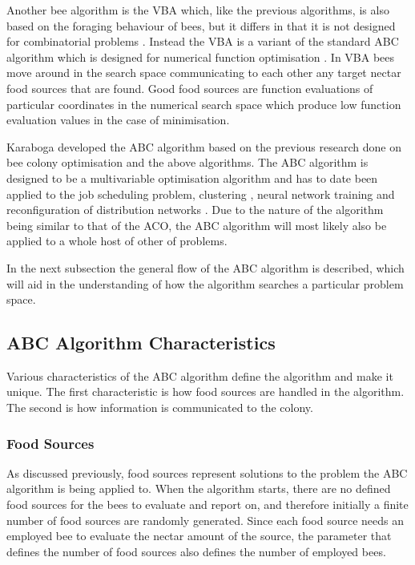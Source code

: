 Another bee algorithm is the \gls{VBA} which, like the previous algorithms, is also based on the foraging behaviour of bees, but it differs in that it is not designed for combinatorial problems \cite{ABCNumericalOptimization}. Instead the \gls{VBA} is a variant of the standard \gls{ABC} algorithm which is designed for numerical function optimisation \cite{ABCNumericalOptimization}. In \gls{VBA} bees move around in the search space communicating to each other any target nectar food sources that are found\cite{ABCNumericalOptimization}. Good food sources are function evaluations of particular coordinates in the numerical search space which produce low function evaluation values in the case of minimisation\cite{ABCNumericalOptimization}.

Karaboga developed the \gls{ABC} algorithm based on the previous research done on bee colony optimisation and the above algorithms. The \gls{ABC} algorithm is designed to be a multivariable optimisation algorithm and has to date been applied to the job scheduling problem, clustering \cite{HybridABCClustering}, neural network training and reconfiguration of distribution networks \cite{ABCReconfigDistro}. Due to the nature of the algorithm being similar to that of the \gls{ACO}, the \gls{ABC} algorithm will most likely also be applied to a whole host of other of problems.

In the next subsection the general flow of the \gls{ABC} algorithm is described, which will aid in the understanding of how the algorithm searches a particular problem space. 
\subsection{ABC Algorithm Characteristics}
Various characteristics of the \gls{ABC} algorithm define the algorithm and make it unique. The first characteristic is how food sources are handled in the algorithm. The second is how information is communicated to the colony.
\subsubsection{Food Sources}
\label{sec:foodsources}
As discussed previously, food sources represent solutions to the problem the \gls{ABC} algorithm is being applied to. When the algorithm starts, there are no defined food sources for the bees to evaluate and report on, and therefore initially a finite number of food sources are randomly generated\cite{BeeJobShop,ABCCompareStudy,ABCFusionGrid,ABCNumericalOptimization,ABCImageEnhancement,ABCReconfigDistro}. Since each food source needs an employed bee to evaluate the nectar amount of the source, the parameter that defines the number of food sources also defines the number of employed bees\cite{ABCCompareStudy,ABCLeafConstrained,ABCNumericalOptimization,ABCImageEnhancement}.

